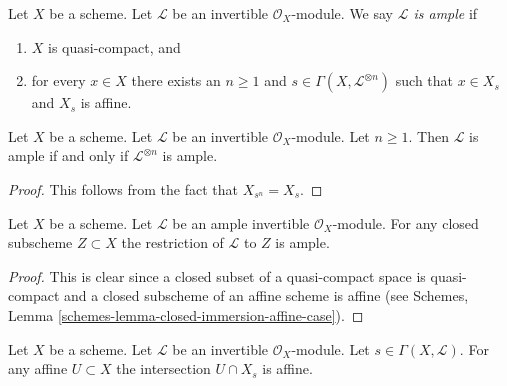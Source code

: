 \begin{definition}
\label{definition-ample}
Let $X$ be a scheme.
Let $\mathcal{L}$ be an invertible $\mathcal{O}_X$-module.
We say {\it $\mathcal{L}$ is ample} if
\begin{enumerate}
\item $X$ is quasi-compact, and
\item for every $x \in X$ there exists an $n \geq 1$
and $s \in \Gamma(X, \mathcal{L}^{\otimes n})$ such
that $x \in X_s$ and $X_s$ is affine.
\end{enumerate}
\end{definition}

\begin{lemma}
\label{lemma-ample-power-ample}
Let $X$ be a scheme. Let $\mathcal{L}$ be an invertible $\mathcal{O}_X$-module.
Let $n \geq 1$. Then $\mathcal{L}$ is ample if and only if
$\mathcal{L}^{\otimes n}$ is ample.
\end{lemma}

\begin{proof}
This follows from the fact that $X_{s^n} = X_s$.
\end{proof}

\begin{lemma}
\label{lemma-ample-on-closed}
Let $X$ be a scheme.
Let $\mathcal{L}$ be an ample invertible $\mathcal{O}_X$-module.
For any closed subscheme $Z \subset X$ the restriction of
$\mathcal{L}$ to $Z$ is ample.
\end{lemma}

\begin{proof}
This is clear since a closed subset of a quasi-compact space is quasi-compact
and a closed subscheme of an affine scheme is affine (see
Schemes, Lemma \ref{schemes-lemma-closed-immersion-affine-case}).
\end{proof}

\begin{lemma}
\label{lemma-affine-cap-s-open}
Let $X$ be a scheme. Let $\mathcal{L}$ be an invertible $\mathcal{O}_X$-module.
Let $s \in \Gamma(X, \mathcal{L})$. For any affine $U \subset X$
the intersection $U \cap X_s$ is affine.
\end{lemma}

